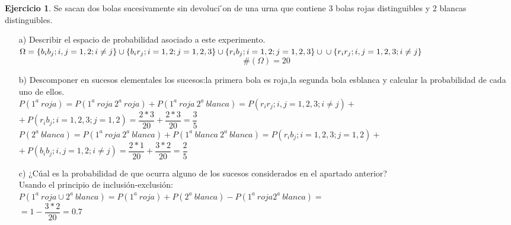 \documentclass[a4paper, 12pt]{article}
\theoremstyle{definition}
\newtheorem{ej}{Ejercicio}
\begin{document}
\newpage

\begin{ej}
Se sacan dos bolas sucesivamente sin devoluci ́on de una urna que contiene 3 bolas rojas distinguibles y 2 blancas distinguibles. \\
\begin{enumerate}
    \item[a) ]Describir el espacio de probabilidad asociado a este experimento.\\
    $\Omega =
    \{b_i b_j; i,j=1,2 ;i \neq j \} \cup \{ b_i r_j; i=1,2 ; j= 1,2,3\} \cup  \{ r_i b_j; i=1,2 ; j= 1,2,3\} \cup \\ \cup \{ r_i r_j; i,j=1,2,3; i\neq j\} $ 
    $$\#(\Omega) = 20$$
    \item[b) ] Descomponer en sucesos elementales los sucesos:la primera bola es roja,la segunda bola esblanca y calcular la probabilidad de cada uno de ellos. \\
    $P(1^a \ roja) = P(1^a \ roja \ 2^a \ roja) + P(1^a \ roja \ 2^a \ blanca) = P(r_i r_j; i,j=1,2,3; i\neq j) +$\\$+ \ P(r_i b_j; i=1,2,3 ; j= 1,2) = \dfrac{2*3}{20} + \dfrac{2*3}{20} = \dfrac{3}{5}$ \\
    $P(2^a \ blanca) = P(1^a \ roja \ 2^a \ blanca) + P(1^a \ blanca \ 2^a \ blanca) = P(r_i b_j; i=1,2,3 ; j= 1,2) +$\\$+ \ P(b_i b_j; i,j=1,2 ;i \neq j) = \dfrac{2*1}{20} + \dfrac{3*2}{20} = \dfrac{2}{5}$
    \item[c) ] ¿Cúal es la probabilidad de que ocurra alguno de los sucesos considerados en el apartado anterior?\\
    Usando el principio de inclusión-exclusión: \\
    $P(1^a \ roja \cup 2^a \ blanca) = P(1^a \ roja) + P(2^a \ blanca) - P(1^a \ roja 2^a \ blanca) =$\\$= 1- \dfrac{3*2}{20} = 0.7$
    
\end{enumerate}
\end{ej}
\end{document}
